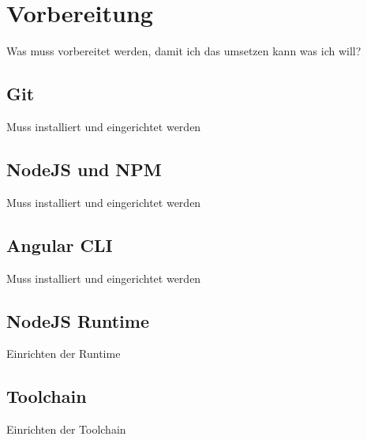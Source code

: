 \section{Vorbereitung}
Was muss vorbereitet werden, damit ich das umsetzen kann was ich will?

\subsection{Git}
Muss installiert und eingerichtet werden

\subsection{NodeJS und NPM}
Muss installiert und eingerichtet werden

\subsection{Angular CLI}
Muss installiert und eingerichtet werden

\subsection{NodeJS Runtime}
Einrichten der Runtime

\subsection{Toolchain}
Einrichten der Toolchain